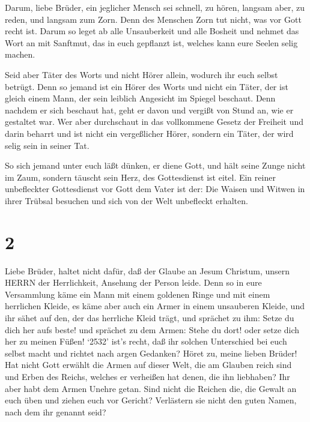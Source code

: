  Darum, liebe Brüder, ein jeglicher Mensch sei schnell, zu
hören, langsam aber, zu reden, und langsam zum Zorn.  Denn
des Menschen Zorn tut nicht, was vor Gott recht ist.  Darum
so leget ab alle Unsauberkeit und alle Bosheit und nehmet das Wort an
mit Sanftmut, das in euch gepflanzt ist, welches kann eure Seelen selig
machen.

 Seid aber Täter des Worts und nicht Hörer allein, wodurch
ihr euch selbst betrügt.  Denn so jemand ist ein Hörer des
Worts und nicht ein Täter, der ist gleich einem Mann, der sein leiblich
Angesicht im Spiegel beschaut.  Denn nachdem er sich
beschaut hat, geht er davon und vergißt von Stund an, wie er gestaltet
war.  Wer aber durchschaut in das vollkommene Gesetz der
Freiheit und darin beharrt und ist nicht ein vergeßlicher Hörer, sondern
ein Täter, der wird selig sein in seiner Tat.

 So sich jemand unter euch läßt dünken, er diene Gott, und
hält seine Zunge nicht im Zaum, sondern täuscht sein Herz, des
Gottesdienst ist eitel.  Ein reiner unbefleckter
Gottesdienst vor Gott dem Vater ist der: Die Waisen und Witwen in ihrer
Trübsal besuchen und sich von der Welt unbefleckt erhalten.

\hypertarget{section-1}{%
\section{2}\label{section-1}}

 Liebe Brüder, haltet nicht dafür, daß der Glaube an Jesum
Christum, unsern HERRN der Herrlichkeit, Ansehung der Person leide.
 Denn so in eure Versammlung käme ein Mann mit einem
goldenen Ringe und mit einem herrlichen Kleide, es käme aber auch ein
Armer in einem unsauberen Kleide,  und ihr sähet auf den,
der das herrliche Kleid trägt, und sprächet zu ihm: Setze du dich her
aufs beste! und sprächet zu dem Armen: Stehe du dort! oder setze dich
her zu meinen Füßen!  `2532' ist's recht, daß ihr solchen
Unterschied bei euch selbst macht und richtet nach argen Gedanken?
 Höret zu, meine lieben Brüder! Hat nicht Gott erwählt die
Armen auf dieser Welt, die am Glauben reich sind und Erben des Reichs,
welches er verheißen hat denen, die ihn liebhaben?  Ihr aber
habt dem Armen Unehre getan. Sind nicht die Reichen die, die Gewalt an
euch üben und ziehen euch vor Gericht?  Verlästern sie nicht
den guten Namen, nach dem ihr genannt seid?

